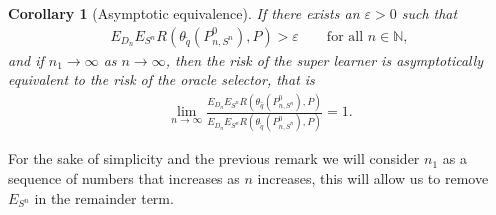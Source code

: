 \documentclass[11pt, a4paper]{article}
\newtheorem{corollary}[theorem]{Corollary}
\theoremstyle{definition}
\theoremstyle{remark}
\newcommand{\q}{q}
\newcommand{\btheta}{\theta}
\newcommand{\Sn}{S^n}
\begin{document}
\begin{corollary}[Asymptotic equivalence] 
    If there exists an $ \varepsilon > 0 $ such that 
   \begin{align*}
       E_{D_n} E_{\Sn} R(\btheta_{ \tilde{\q} }(P_{n, \Sn}^{0}), P) > \varepsilon \qquad \text{for all } n \in \mathbb{N},
   \end{align*}
   and if $ n_1 \to \infty $ as $ n \to \infty $, then the risk of the super learner is asymptotically equivalent to the risk of the oracle selector, that is
   \begin{align*}
       \lim_{n \to \infty} \frac{E_{D_n} E_{\Sn} R(\btheta_{ \hat{\q} }(P_{n, \Sn}^{0}), P)}{E_{D_n} E_{\Sn} R(\btheta_{ \tilde{\q} }(P_{n, \Sn}^{0}), P)} = 1.
   \end{align*}
\end{corollary}
For the sake of simplicity and the previous remark we will consider $ n_1 $ as a sequence of numbers that increases as $ n $ increases, this will allow us to remove $ E_{\Sn} $ in the remainder term. 
\end{document}
